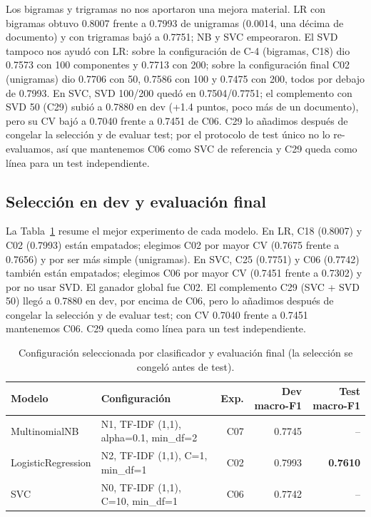\documentclass[11pt,a4paper]{article}
\begin{document}
Los bigramas y trigramas no nos aportaron una mejora material. LR con bigramas obtuvo 0.8007
frente a 0.7993 de unigramas (0.0014, una décima de documento) y con trigramas bajó a
0.7751; NB y SVC empeoraron. El SVD tampoco nos ayudó con LR: sobre la configuración de C-4 (bigramas,
C18) dio 0.7573 con 100 componentes y 0.7713 con 200; sobre la configuración final C02
(unigramas) dio 0.7706 con 50, 0.7586 con 100 y 0.7475 con 200, todos por debajo de
0.7993. En SVC, SVD 100/200 quedó en 0.7504/0.7751; el complemento con SVD 50 (C29) subió
a 0.7880 en dev (+1.4 puntos, poco más de un documento), pero su CV bajó a 0.7040 frente a
0.7451 de C06. C29 lo añadimos después de congelar la selección y de evaluar test; por el
protocolo de test único no lo re-evaluamos, así que mantenemos C06 como SVC de referencia y
C29 queda como línea para un test independiente.

\subsection{Selección en dev y evaluación final}
La Tabla~\ref{tab:seleccion} resume el mejor experimento de cada modelo. En LR, C18
(0.8007) y C02 (0.7993) están empatados; elegimos C02 por mayor CV (0.7675 frente a
0.7656) y por ser más simple (unigramas). En SVC, C25 (0.7751) y C06 (0.7742) también
están empatados; elegimos C06 por mayor CV (0.7451 frente a 0.7302) y por no usar SVD. El
ganador global fue C02. El complemento C29 (SVC + SVD 50) llegó a 0.7880 en dev, por
encima de C06, pero lo añadimos después de congelar la selección y de evaluar test; con CV
0.7040 frente a 0.7451 mantenemos C06. C29 queda como línea para un test independiente.

\begin{table}[htbp]
\centering
\small
\caption{Configuración seleccionada por clasificador y evaluación final (la selección se congeló antes de test).}
\label{tab:seleccion}
\begin{tabular}{@{}llrrr@{}}
\toprule
Modelo & Configuración & Exp. & Dev macro-F1 & Test macro-F1\\
\midrule
MultinomialNB & N1, TF-IDF (1,1), alpha=0.1, min\_df=2 & C07 & 0.7745 & --\\
LogisticRegression & N2, TF-IDF (1,1), C=1, min\_df=1 & C02 & 0.7993 & \textbf{0.7610}\\
SVC & N0, TF-IDF (1,1), C=10, min\_df=1 & C06 & 0.7742 & --\\
\bottomrule
\end{tabular}
\end{table}
\end{document}
